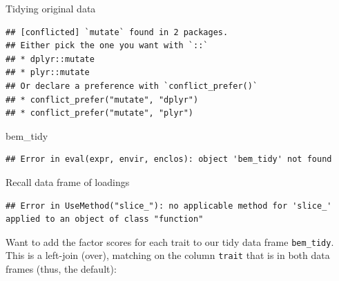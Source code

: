 \documentclass[ignorenonframetext,]{beamer}
\newenvironment{Shaded}{\begin{snugshade}}{\end{snugshade}}
\newcommand{\DataTypeTok}[1]{\textcolor[rgb]{0.13,0.29,0.53}{#1}}
\newcommand{\DecValTok}[1]{\textcolor[rgb]{0.00,0.00,0.81}{#1}}
\newcommand{\KeywordTok}[1]{\textcolor[rgb]{0.13,0.29,0.53}{\textbf{#1}}}
\newcommand{\NormalTok}[1]{#1}
\newcommand{\OperatorTok}[1]{\textcolor[rgb]{0.81,0.36,0.00}{\textbf{#1}}}
\newcommand{\StringTok}[1]{\textcolor[rgb]{0.31,0.60,0.02}{#1}}
\begin{document}
\begin{frame}[fragile]{Tidying original data}
\protect\hypertarget{tidying-original-data}{}

\begin{Shaded}
\end{Shaded}

\begin{verbatim}
## [conflicted] `mutate` found in 2 packages.
## Either pick the one you want with `::` 
## * dplyr::mutate
## * plyr::mutate
## Or declare a preference with `conflict_prefer()`
## * conflict_prefer("mutate", "dplyr")
## * conflict_prefer("mutate", "plyr")
\end{verbatim}

\begin{Shaded}
\begin{Highlighting}[]
\NormalTok{bem_tidy}
\end{Highlighting}
\end{Shaded}

\begin{verbatim}
## Error in eval(expr, envir, enclos): object 'bem_tidy' not found
\end{verbatim}

\end{frame}

\begin{frame}[fragile]{Recall data frame of loadings}
\protect\hypertarget{recall-data-frame-of-loadings}{}

\begin{Shaded}
\end{Shaded}

\begin{verbatim}
## Error in UseMethod("slice_"): no applicable method for 'slice_' applied to an object of class "function"
\end{verbatim}

Want to add the factor scores for each trait to our tidy data frame
\texttt{bem\_tidy}. This is a left-join (over), matching on the column
\texttt{trait} that is in both data frames (thus, the default):

\end{frame}
\end{document}
